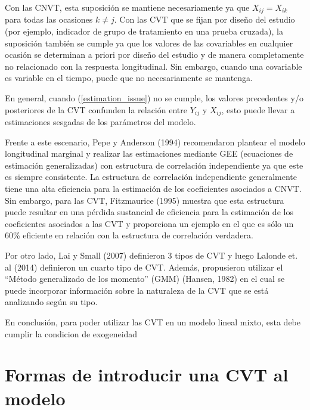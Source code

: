 \documentclass[spanish]{article}
\numberwithin{figure}{subsection}
\numberwithin{equation}{subsection}
\numberwithin{table}{subsection}
\begin{document}
Con las CNVT, esta suposición se mantiene necesariamente ya que $X_{ij} =
X_{ik}$ para todas las ocasiones $k \neq j$. Con las CVT que se fijan por diseño
del estudio (por ejemplo, indicador de grupo de tratamiento en una prueba
cruzada), la suposición también se cumple ya que los valores de las covariables
en cualquier ocasión se determinan a priori por diseño del estudio y de manera
completamente no relacionado con la respuesta longitudinal. Sin embargo, cuando
una covariable es variable en el tiempo, puede que no necesariamente se
mantenga.

En general, cuando (\ref{estimation_issue}) no se cumple, los valores
precedentes y/o posteriores de la CVT confunden la relación entre $Y_{ij}$ y
$X_{ij}$, esto puede llevar a estimaciones sesgadas de los parámetros del
modelo.

Frente a este escenario, Pepe y Anderson (1994) recomendaron plantear el modelo
longitudinal marginal y realizar las estimaciones mediante GEE (ecuaciones de
estimación generalizadas) con estructura de correlación independiente ya que
este es siempre consistente. La estructura de correlación independiente
generalmente tiene una alta eficiencia para la estimación de los coeficientes
asociados a CNVT. Sin embargo, para las CVT, Fitzmaurice (1995) muestra que esta
estructura puede resultar en una pérdida sustancial de eficiencia para la
estimación de los coeficientes asociados a las CVT y proporciona un ejemplo en
el que es sólo un 60\% eficiente en relación con la estructura de correlación
verdadera.

Por otro lado, Lai y Small (2007) definieron 3 tipos de CVT y luego Lalonde et.
al (2014) definieron un cuarto tipo de CVT. Además, propusieron utilizar el
``Método generalizado de los momento'' (GMM) (Hansen, 1982) en el cual se puede
incorporar información sobre la naturaleza de la CVT que se está analizando
según su tipo.

En conclusión, para poder utilizar las CVT en un modelo lineal mixto, esta debe
cumplir la condicion de exogeneidad

\newpage


\section{Formas de introducir una CVT al modelo}
\end{document}
